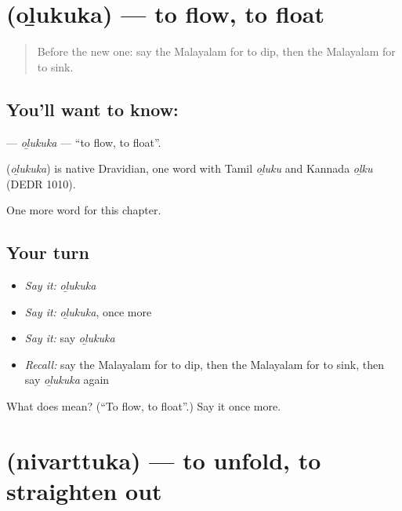 \section[\texorpdfstring{\ml{ഒഴുകുക} (oḻukuka)}{ഒഴുകുക (oḻukuka)}]{ (oḻukuka) — to flow, to float}

\label{lesson:ML-C232-olukuka}



\begin{quote}
Before the new one: say the Malayalam for to dip, then the Malayalam for to sink.
\end{quote}

\subsection*{You'll want to know: }
\textbf{} — \emph{oḻukuka} — \textquotedblleft{}to flow, to float\textquotedblright{}.

\begin{cousinweb}
\textbf{} (\emph{oḻukuka}) is native Dravidian, one word with Tamil \emph{oḻuku} and Kannada \emph{oḻku} (DEDR 1010).
\end{cousinweb}

\begin{grammarlens}[title={What you've built}]
One more word for this chapter.
\end{grammarlens}

\subsection*{Your turn}
\begin{itemize}
\raggedright
  \item \emph{Say it:} \emph{oḻukuka}
  \item \emph{Say it:} \emph{oḻukuka}, once more
  \item \emph{Say it:} say \emph{oḻukuka}
  \item \emph{Recall:} say the Malayalam for to dip, then the Malayalam for to sink, then say \emph{oḻukuka} again
\end{itemize}

\begin{tcolorbox}[breakable,colback=teal!4,colframe=teal!35!black,title={Before you move on}]
What does  mean? (\textquotedblleft{}To flow, to float\textquotedblright{}.) Say it once more.
\end{tcolorbox}
\section[\texorpdfstring{\ml{നിവർത്തുക} (nivarttuka)}{നിവർത്തുക (nivarttuka)}]{ (nivarttuka) — to unfold, to straighten out}

